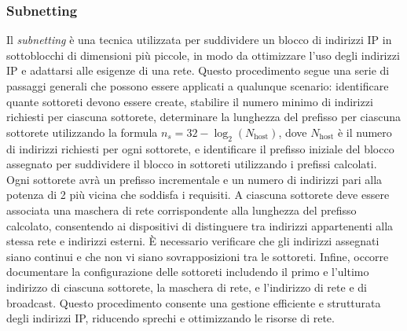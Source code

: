 \documentclass[12pt]{report}
\begin{document}
\subsubsection{Subnetting}
Il \textit{subnetting} è una tecnica utilizzata per suddividere un blocco di indirizzi IP in sottoblocchi di dimensioni più piccole, in modo da ottimizzare l'uso degli indirizzi IP e adattarsi alle esigenze di una rete. Questo procedimento segue una serie di passaggi generali che possono essere applicati a qualunque scenario: identificare quante sottoreti devono essere create, stabilire il numero minimo di indirizzi richiesti per ciascuna sottorete, determinare la lunghezza del prefisso per ciascuna sottorete utilizzando la formula $n_s = 32 - \log_2(N_\text{host})$, dove $N_\text{host}$ è il numero di indirizzi richiesti per ogni sottorete, e identificare il prefisso iniziale del blocco assegnato per suddividere il blocco in sottoreti utilizzando i prefissi calcolati. Ogni sottorete avrà un prefisso incrementale e un numero di indirizzi pari alla potenza di 2 più vicina che soddisfa i requisiti. A ciascuna sottorete deve essere associata una maschera di rete corrispondente alla lunghezza del prefisso calcolato, consentendo ai dispositivi di distinguere tra indirizzi appartenenti alla stessa rete e indirizzi esterni. È necessario verificare che gli indirizzi assegnati siano continui e che non vi siano sovrapposizioni tra le sottoreti. Infine, occorre documentare la configurazione delle sottoreti includendo il primo e l'ultimo indirizzo di ciascuna sottorete, la maschera di rete, e l'indirizzo di rete e di broadcast. Questo procedimento consente una gestione efficiente e strutturata degli indirizzi IP, riducendo sprechi e ottimizzando le risorse di rete.
\end{document}
